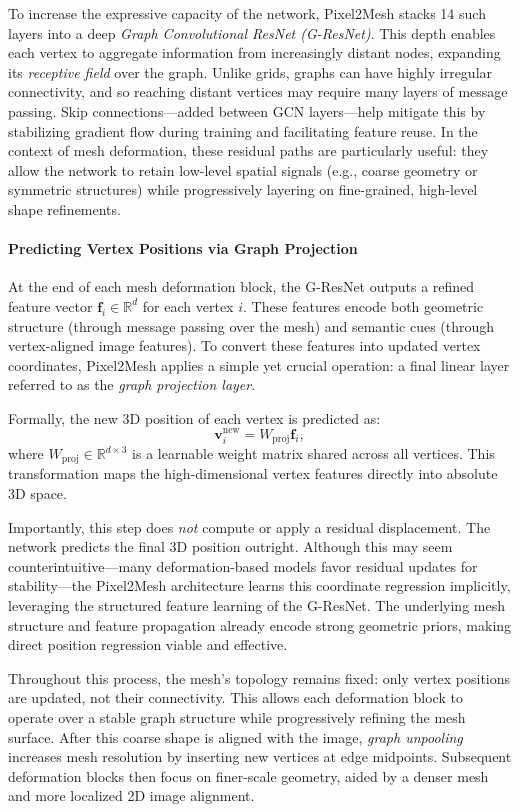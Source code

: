 To increase the expressive capacity of the network, Pixel2Mesh stacks 14 such layers into a deep \emph{Graph Convolutional ResNet (G-ResNet)}. This depth enables each vertex to aggregate information from increasingly distant nodes, expanding its \emph{receptive field} over the graph. Unlike grids, graphs can have highly irregular connectivity, and so reaching distant vertices may require many layers of message passing. Skip connections—added between GCN layers—help mitigate this by stabilizing gradient flow during training and facilitating feature reuse. In the context of mesh deformation, these residual paths are particularly useful: they allow the network to retain low-level spatial signals (e.g., coarse geometry or symmetric structures) while progressively layering on fine-grained, high-level shape refinements.

\paragraph{Predicting Vertex Positions via Graph Projection}

At the end of each mesh deformation block, the G-ResNet outputs a refined feature vector \( \mathbf{f}_i \in \mathbb{R}^d \) for each vertex \( i \). These features encode both geometric structure (through message passing over the mesh) and semantic cues (through vertex-aligned image features). To convert these features into updated vertex coordinates, Pixel2Mesh applies a simple yet crucial operation: a final linear layer referred to as the \emph{graph projection layer}.

Formally, the new 3D position of each vertex is predicted as:
\[
\mathbf{v}_i^{\text{new}} = W_{\text{proj}} \mathbf{f}_i,
\]
where \( W_{\text{proj}} \in \mathbb{R}^{d \times 3} \) is a learnable weight matrix shared across all vertices. This transformation maps the high-dimensional vertex features directly into absolute 3D space.

Importantly, this step does \emph{not} compute or apply a residual displacement. The network predicts the final 3D position outright. Although this may seem counterintuitive—many deformation-based models favor residual updates for stability—the Pixel2Mesh architecture learns this coordinate regression implicitly, leveraging the structured feature learning of the G-ResNet. The underlying mesh structure and feature propagation already encode strong geometric priors, making direct position regression viable and effective.

Throughout this process, the mesh’s topology remains fixed: only vertex positions are updated, not their connectivity. This allows each deformation block to operate over a stable graph structure while progressively refining the mesh surface. After this coarse shape is aligned with the image, \emph{graph unpooling} increases mesh resolution by inserting new vertices at edge midpoints. Subsequent deformation blocks then focus on finer-scale geometry, aided by a denser mesh and more localized 2D image alignment.

